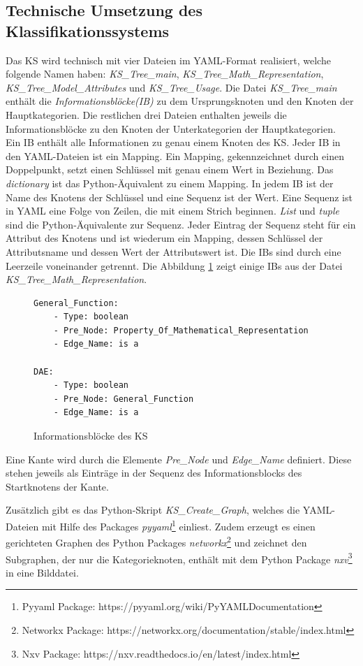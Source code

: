 \subsection{Technische Umsetzung des Klassifikationssystems}
\label{Ch:Ergebnisse:Sec:KS:SubSec:TechUmsetzung}
Das KS wird technisch mit vier Dateien im YAML-Format realisiert, welche folgende Namen haben: \textit{KS\_Tree\_main}, \textit{KS\_Tree\_Math\_Representation}, \textit{KS\_Tree\_Model\_Attributes} und \textit{KS\_Tree\_Usage}. Die Datei \textit{KS\_Tree\_main} enthält die \textit{Informationsblöcke(IB)} zu dem Ursprungsknoten und den Knoten der Hauptkategorien. Die restlichen drei Dateien enthalten jeweils die Informationsblöcke zu den Knoten der Unterkategorien der Hauptkategorien. \\ 
Ein IB enthält alle Informationen zu genau einem Knoten des KS. Jeder IB in den YAML-Dateien ist ein Mapping. Ein Mapping, gekennzeichnet durch einen Doppelpunkt, setzt einen Schlüssel mit genau einem Wert in Beziehung. Das \textit{dictionary} ist das Python-Äquivalent zu einem Mapping. In jedem IB ist der Name des Knotens der Schlüssel und eine Sequenz ist der Wert. Eine Sequenz ist in YAML eine Folge von Zeilen, die mit einem Strich beginnen. \textit{List} und \textit{tuple} sind die Python-Äquivalente zur Sequenz. Jeder Eintrag der Sequenz steht für ein Attribut des Knotens und ist wiederum ein Mapping, dessen Schlüssel der Attributsname und dessen Wert der Attributswert ist. Die IB\grq s sind durch eine Leerzeile voneinander getrennt. Die Abbildung \ref{fig:IBs} zeigt einige IB\grq s aus der Datei \textit{KS\_Tree\_Math\_Representation}.\\ 
\begin{figure}
	\centering
	\begin{lstlisting}
General_Function:
	- Type: boolean
	- Pre_Node: Property_Of_Mathematical_Representation
	- Edge_Name: is a

DAE: 
	- Type: boolean
	- Pre_Node: General_Function
	- Edge_Name: is a
	\end{lstlisting}
	\caption{Informationsblöcke des KS}
	\label{fig:IBs}
\end{figure}

Eine Kante wird durch die Elemente \textit{Pre\_Node} und \textit{Edge\_Name} definiert. Diese stehen jeweils als Einträge in der Sequenz des Informationsblocks des Startknotens der Kante.

Zusätzlich gibt es das Python-Skript \textit{KS\_Create\_Graph}, welches die YAML-Dateien mit Hilfe des Packages \textit{pyyaml}\footnote{Pyyaml Package: https://pyyaml.org/wiki/PyYAMLDocumentation} einliest. Zudem erzeugt es einen gerichteten Graphen des Python Packages \textit{networkx}\footnote{Networkx Package: https://networkx.org/documentation/stable/index.html} und zeichnet den Subgraphen, der nur die Kategorieknoten, enthält mit dem Python Package \textit{nxv}\footnote{Nxv Package: https://nxv.readthedocs.io/en/latest/index.html} in eine Bilddatei.

